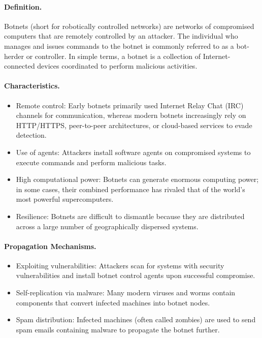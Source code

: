 \paragraph{Definition.}
Botnets (short for robotically controlled networks) are networks of compromised computers that are remotely controlled by an attacker. The individual who manages and issues commands to the botnet is commonly referred to as a bot-herder or controller. In simple terms, a botnet is a collection of Internet-connected devices coordinated to perform malicious activities.

\paragraph{Characteristics.}
\begin{itemize}
  \item Remote control: Early botnets primarily used Internet Relay Chat (IRC) channels for communication, whereas modern botnets increasingly rely on HTTP/HTTPS, peer-to-peer architectures, or cloud-based services to evade detection.
  \item Use of agents: Attackers install software agents on compromised systems to execute commands and perform malicious tasks.
  \item High computational power: Botnets can generate enormous computing power; in some cases, their combined performance has rivaled that of the world's most powerful supercomputers.
  \item Resilience: Botnets are difficult to dismantle because they are distributed across a large number of geographically dispersed systems.
\end{itemize}

\paragraph{Propagation Mechanisms.}
\begin{itemize}
  \item Exploiting vulnerabilities: Attackers scan for systems with security vulnerabilities and install botnet control agents upon successful compromise.
  \item Self-replication via malware: Many modern viruses and worms contain components that convert infected machines into botnet nodes.
  \item Spam distribution: Infected machines (often called zombies) are used to send spam emails containing malware to propagate the botnet further.
\end{itemize}

